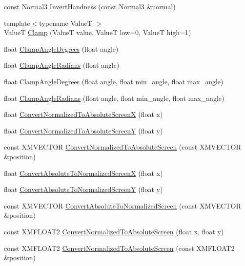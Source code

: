 \begin{DoxyCompactItemize}
\item 
const \hyperlink{structmage_1_1_normal3}{Normal3} \hyperlink{namespacemage_a99775511a838e6d840a83e5ca31e3306}{Invert\+Handness} (const \hyperlink{structmage_1_1_normal3}{Normal3} \&normal)
\item 
{\footnotesize template$<$typename ValueT $>$ }\\ValueT \hyperlink{namespacemage_af377e4f18912fcbff49672a124c344b2}{Clamp} (ValueT value, ValueT low=0, ValueT high=1)
\item 
float \hyperlink{namespacemage_a0024d4f40403506605dc7ca57ff83d1f}{Clamp\+Angle\+Degrees} (float angle)
\item 
float \hyperlink{namespacemage_a0361d0febf0543c594a31fede401d157}{Clamp\+Angle\+Radians} (float angle)
\item 
float \hyperlink{namespacemage_a1cc8a7302f05f1e890dabc6fe98e1496}{Clamp\+Angle\+Degrees} (float angle, float min\+\_\+angle, float max\+\_\+angle)
\item 
float \hyperlink{namespacemage_a85caeb6cab349e4eff83919fbf430700}{Clamp\+Angle\+Radians} (float angle, float min\+\_\+angle, float max\+\_\+angle)
\item 
float \hyperlink{namespacemage_a2dbd3992e0bcb94b465ab4ab6b7d7f83}{Convert\+Normalized\+To\+Absolute\+ScreenX} (float x)
\item 
float \hyperlink{namespacemage_abc0e5fd9efdcd160a7c4e9b14c8ec7b6}{Convert\+Normalized\+To\+Absolute\+ScreenY} (float y)
\item 
const X\+M\+V\+E\+C\+T\+OR \hyperlink{namespacemage_a37cd57f31a66aac5355061bc3ad4e5ec}{Convert\+Normalized\+To\+Absolute\+Screen} (const X\+M\+V\+E\+C\+T\+OR \&position)
\item 
float \hyperlink{namespacemage_a7ad05dbf5e2b5d625daf57f43b26217f}{Convert\+Absolute\+To\+Normalized\+ScreenX} (float x)
\item 
float \hyperlink{namespacemage_a4300e91e448d76e1015cbc806c1d4467}{Convert\+Absolute\+To\+Normalized\+ScreenY} (float y)
\item 
const X\+M\+V\+E\+C\+T\+OR \hyperlink{namespacemage_add9fc09b8a7166c5e0d0bde63d8f2747}{Convert\+Absolute\+To\+Normalized\+Screen} (const X\+M\+V\+E\+C\+T\+OR \&position)
\item 
const X\+M\+F\+L\+O\+A\+T2 \hyperlink{namespacemage_a34b18c1eb8d1e94675b10c86845e2564}{Convert\+Normalized\+To\+Absolute\+Screen} (float x, float y)
\item 
const X\+M\+F\+L\+O\+A\+T2 \hyperlink{namespacemage_aec1ce8ea913d981f727765f39f79d5e3}{Convert\+Normalized\+To\+Absolute\+Screen} (const X\+M\+F\+L\+O\+A\+T2 \&position)

\end{DoxyCompactItemize}
